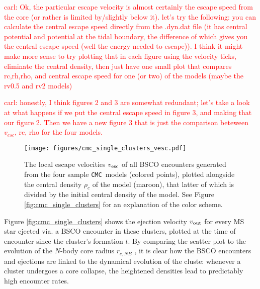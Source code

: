 \documentclass[twocolumn]{aastex631}
\newcommand{\CMC}{\texttt{CMC}}
\newcommand{\carl}[1]{\textcolor{red}{carl: #1}}
\begin{document}
\carl{Ok, the particular escape velocity is almost certainly the escape speed from the core (or rather is limited by/slightly below it).  let's try the following: you can calculate the central escape speed directly from the .dyn.dat file (it has central potential and potential at the tidal boundary, the difference of which gives you the central escape speed (well the energy needed to escape)). I think it might make more sense to try plotting that in each figure using the velocity ticks, eliminate the central density, then just have one small plot that compares rc,rh,rho, and central escape speed for one (or two) of the models (maybe the rv0.5 and rv2 models)}

\carl{honestly, I think figures 2 and 3 are somewhat redundant; let's take a look at what happens if we put the central escape speed in figure 3, and making that our figure 2. Then we have a new figure 3 that is just the comparison beteween $v_{esc}$, rc, rho for the four models.}

\begin{figure}
    \centering
    \texttt{[image: figures/cmc\_single\_clusters\_vesc.pdf]}
    \caption{
        The local escape velocities $v_{\rm esc}$ of all BSCO encounters generated from the four sample \CMC\ models (colored points), plotted alongside the central density $\rho_c$ of the model (maroon), that latter of which is divided by the initial central density of the model.
        See Figure \ref{fig:cmc_single_clusters} for an explanation of the color scheme.
    }
    \label{fig:cmc_single_clusters_vesc}
\end{figure}

Figure \ref{fig:cmc_single_clusters} shows the ejection velocity $v_{\rm out}$ for every MS star ejected via. a BSCO encounter in these clusters, plotted at the time of encounter since the cluster's formation $t$.
By comparing the scatter plot to the evolution of the $N$-body core radius $r_{c, NB}$ \citep{1985ApJ...298...80C}, it is clear how the BSCO encounters and ejections are linked to the dynamical evolution of the cluste: whenever a cluster undergoes a core collapse, the heightened densities lead to predictably high encounter rates.
\end{document}
